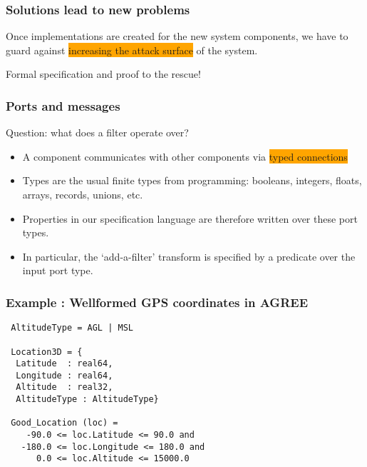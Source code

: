 \documentclass{beamer}
\newcommand{\kemph}[1]{\colorbox{orange}{#1}}
\begin{document}
\begin{frame}\frametitle{Solutions lead to new problems}

Once implementations are created for the new system components, we
have to guard against \kemph{increasing the attack surface} of the system.

Formal specification and proof to the rescue!

\end{frame}

\begin{frame}\frametitle{Ports and messages}

Question: what does a filter operate over?

\begin{itemize}

\item A component communicates with other components via \kemph{typed connections}

\item  Types are the usual finite types from programming: booleans,
  integers, floats, arrays, records, unions, etc.

\item Properties in our specification language are therefore
  written over these port types.

\item In particular, the `add-a-filter' transform is specified by a predicate over the input port type.

\end{itemize}

\end{frame}

\begin{frame}[fragile]\frametitle{Example : Wellformed GPS coordinates in AGREE}

{\small
\begin{verbatim}
 AltitudeType = AGL | MSL

 Location3D = {
  Latitude  : real64,
  Longitude : real64,
  Altitude  : real32,
  AltitudeType : AltitudeType}

 Good_Location (loc) =
    -90.0 <= loc.Latitude <= 90.0 and
   -180.0 <= loc.Longitude <= 180.0 and
      0.0 <= loc.Altitude <= 15000.0
\end{verbatim}
}

\end{frame}
\end{document}
